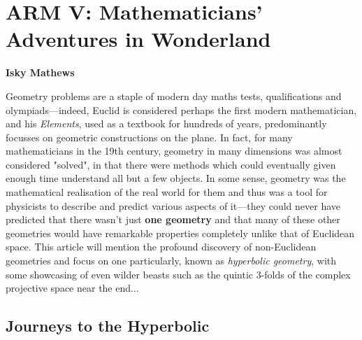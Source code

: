 \chapter{ARM V: Mathematicians' Adventures in Wonderland}

\hspace{\fill}\textbf{Isky Mathews}

\begin{multicols}{2}

Geometry problems are a staple of modern day maths tests, qualifications and olympiads---indeed, Euclid is considered perhaps the first modern mathematician, and his \textit{Elements}, used as a textbook for hundreds of years, predominantly focusses on geometric constructions on the plane. In fact, for many mathematicians in the 19th century, geometry in many dimensions was almost considered "solved", in that there were methods which could eventually given enough time understand all but a few objects. In some sense, geometry was the mathematical realisation of the real world for them and thus was a tool for physicists to describe and predict various aspects of it---they could never have predicted that there wasn't just \textbf{one geometry} and that many of these other geometries would have remarkable properties completely unlike that of Euclidean space. This article will mention the profound discovery of non-Euclidean geometries and focus on one particularly, known as \textit{hyperbolic geometry}, with some showcasing of even wilder beasts such as the quintic 3-folds of the complex projective space near the end...

\end{multicols}

\section{Journeys to the Hyperbolic}

